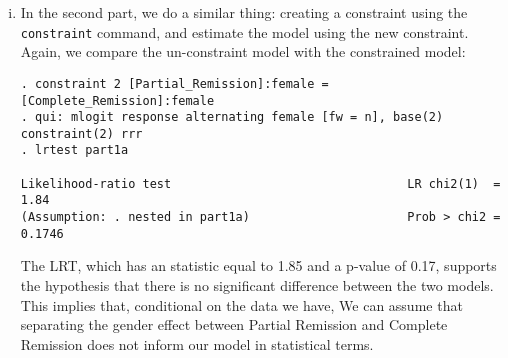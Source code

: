 \documentclass{article}
\begin{document}
\begin{enumerate}[a.]
\begin{enumerate}[i.]
	\item In the second part, we do a similar thing: creating a constraint using the \texttt{constraint} command, and estimate the model using the new constraint. Again, we compare the un-constraint model with the constrained model:
	
\begin{verbatim}
. constraint 2 [Partial_Remission]:female = [Complete_Remission]:female
. qui: mlogit response alternating female [fw = n], base(2) constraint(2) rrr
. lrtest part1a

Likelihood-ratio test                                 LR chi2(1)  =      1.84
(Assumption: . nested in part1a)                      Prob > chi2 =    0.1746
\end{verbatim}

The LRT, which has an statistic equal to 1.85 and a p-value of 0.17, supports the hypothesis that there is no significant difference between the two models. This implies that, conditional on the data we have, We can assume that separating the gender effect between Partial Remission and Complete Remission does not inform our model in statistical terms.
	
\end{enumerate}


\end{enumerate}
\end{document}
